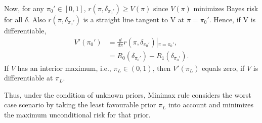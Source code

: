 \documentclass[a4paper,english,12pt]{article}
\begin{document}
Now, for any $\pi_0' \in [0,1]$, $r(\pi,\delta_{\pi_0'})\geq V(\pi)$ since $V(\pi)$ minimizes Bayes risk for all $\delta$. Also $r(\pi,\delta_{\pi_0'})$ is a straight line tangent to V at $\pi=\pi_0'$. Hence, if V is differentiable,
\begin{align}
V'(\pi_0') &= \frac{d}{{d\pi }}r(\pi ,{\delta _{{\pi _0'}}})\left| {_{\pi  = {\pi _0'}}}, \right.\\\nonumber
&= {R_0}({\delta_{{\pi_0'}}})- {R_1}({\delta_{{\pi_0'}}}).
\end{align} 
If $V$ has an interior maximum, i.e., $\pi_L\in (0,1)$, then $V'(\pi_L)$ equals zero, if $V$ is differentiable at $\pi_L$. 
\par Thus, under the condition of unknown priors, Minimax rule considers the worst case scenario by taking the least favourable prior $\pi_L$ into account and minimizes the maximum unconditional risk for that prior.
\end{document}
